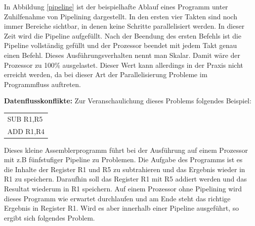 \documentclass[12pt]{article}
\begin{document}
In Abbildung \ref{pipeline} ist der beispielhafte Ablauf eines Programm unter Zuhilfenahme von Pipelining dargestellt. In den ersten vier Takten sind noch immer Bereiche sichtbar, in denen keine Schritte parallelisiert werden. In dieser Zeit wird die Pipeline aufgefüllt. Nach der Beendung des ersten Befehls ist die Pipeline vollständig gefüllt und der Prozessor beendet mit jedem Takt genau einen Befehl. Dieses Ausführungsverhalten nennt man Skalar. Damit wäre der Prozessor zu 100\% ausgelastet. Dieser Wert kann allerdings in der Praxis nicht erreicht werden, da bei dieser Art der Parallelisierung Probleme im Programmfluss auftreten.

\noindent\textbf{Datenflusskonflikte:} Zur Veranschaulichung dieses Problems folgendes Beispiel:

\begin{table}[!htb]
\centering
\label{confliktProgramm}
\begin{tabular}{l}
SUB R1,R5 \\
ADD R1,R4
\end{tabular}
\end{table}

\noindent Dieses kleine Assemblerprogramm führt bei der Ausführung auf einem Prozessor mit z.B fünfstufiger Pipeline zu Problemen. Die Aufgabe des Programms ist es die Inhalte der Register R1 und R5 zu subtrahieren und das Ergebnis wieder in R1 zu speichern. Daraufhin soll das Register R1 mit R5 addiert werden und das Resultat wiederum in R1 speichern. Auf einem Prozessor ohne Pipelining wird dieses Programm wie erwartet durchlaufen und am Ende steht das richtige Ergebnis in Register R1. Wird es aber innerhalb einer Pipeline ausgeführt, so ergibt sich folgendes Problem.
\end{document}
